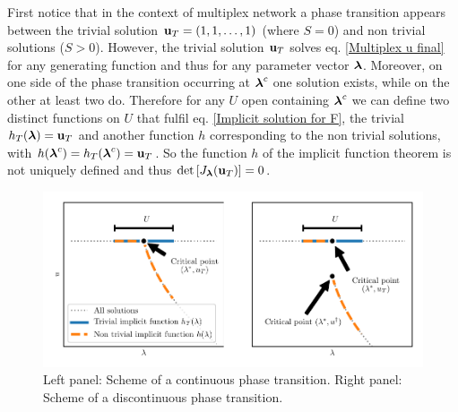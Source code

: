 \documentclass[
11pt, %
english, %
singlespacing, %
nolistspacing, %
liststotoc, %
headsepline, %
]{MastersDoctoralThesis} %
\begin{document}
First notice that in the context of multiplex network a phase transition appears between the trivial solution $\boldsymbol{\mathrm{u}}_T = (1, 1, \dots, 1)$ (where $S = 0$) and non trivial solutions ($S > 0$). However, the trivial solution $\boldsymbol{\mathrm{u}}_T$ solves eq. \eqref{Multiplex u final} for any generating function and thus for any parameter vector $\boldsymbol{\mathrm{\lambda}}$. Moreover, on one side of the phase transition occurring at $\boldsymbol{\mathrm{\lambda}}^c$ one solution exists, while on the other at least two do. Therefore for any $U$ open containing $\boldsymbol{\mathrm{\lambda}}^c$ we can define two distinct functions on $U$ that fulfil eq. \eqref{Implicit solution for F}, the trivial $h_T(\boldsymbol{\mathrm{\lambda}}) = \boldsymbol{\mathrm{u}}_T$ and another function $h$ corresponding to the non trivial solutions, with $h(\boldsymbol{\mathrm{\lambda}}^c) = h_T(\boldsymbol{\mathrm{\lambda}}^c) = \boldsymbol{\mathrm{u}}_T$. So the function $h$ of the implicit function theorem is not uniquely defined and thus $\det\left[ J_{\boldsymbol{\mathrm{\lambda}}}(\boldsymbol{\mathrm{u}}_T) \right] = 0$.

\begin{figure}
	\includegraphics[width=\textwidth]{critical_point.pdf}
	\caption{Left panel: Scheme of a continuous phase transition. Right panel: Scheme of a discontinuous phase transition.}
	\label{Figure: Scheme of continuous and discontinuous phase transitions}
\end{figure}
\end{document}
